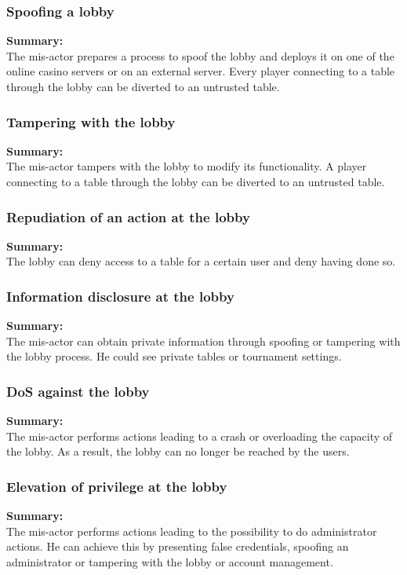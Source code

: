 \documentclass[a4paper,11pt]{report}
\begin{document}
\subsubsection{Spoofing a lobby}
\label{LobbyCasesS}
\textbf{Summary:} \\
The mis-actor prepares a process to spoof the lobby and deploys it on one of the online casino servers or on an external server. Every player connecting to a table through the lobby can be diverted to an untrusted table.
\subsubsection{Tampering with the lobby}
\label{LobbyCasesT}
\textbf{Summary:} \\
The mis-actor tampers with the lobby to modify its functionality. A player connecting to a table through the lobby can be diverted to an untrusted table.
\subsubsection{Repudiation of an action at the lobby}
\label{LobbyCasesR}
\textbf{Summary:} \\
The lobby can deny access to a table for a certain user and deny having done so.

\subsubsection{Information disclosure at the lobby}
\label{LobbyCasesI}
\textbf{Summary:} \\
The mis-actor can obtain private information through spoofing or tampering with the lobby process. He could see private tables or tournament settings.

\subsubsection{DoS against the lobby}
\label{LobbyCasesD}
\textbf{Summary:} \\
The mis-actor performs actions leading to a crash or overloading the capacity of the lobby. As a result, the lobby can no longer be reached by the users.
\subsubsection{Elevation of privilege at the lobby}
\label{LobbyCasesE}
\textbf{Summary:} \\
The mis-actor performs actions leading to the possibility to do administrator actions. He can achieve this by presenting false credentials, spoofing an administrator or tampering with the lobby or account management.
\end{document}
